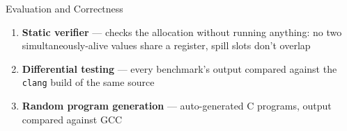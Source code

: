\documentclass[aspectratio=169,11pt]{beamer}
\begin{document}
\begin{frame}{Evaluation and Correctness}
\begin{minipage}{0.97\textwidth}
\begin{enumerate}\scriptsize
  \item \textbf{Static verifier} --- checks the allocation without running
        anything: no two simultaneously-alive values share a register, spill
        slots don't overlap
  \item \textbf{Differential testing} --- every benchmark's output compared
        against the \texttt{clang} build of the same source
  \item \textbf{Random program generation} --- auto-generated C programs, output
        compared against GCC
\end{enumerate}
\end{minipage}
\end{frame}

\end{document}

